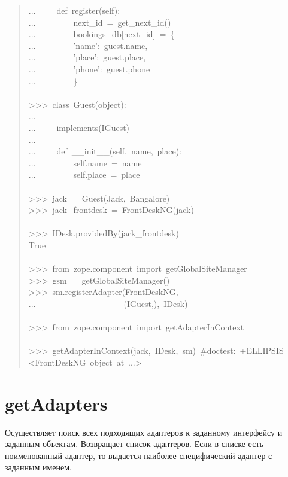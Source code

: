 \documentclass[14pt,a4paper,openany,twoside,final]{extbook}
\begin{document}
\begin{quote}
{...~~~~~def~register(self):\\
...~~~~~~~~~next\_id~=~get\_next\_id()\\
...~~~~~~~~~bookings\_db{[}next\_id{]}~=~\{\\
...~~~~~~~~~'name':~guest.name,\\
...~~~~~~~~~'place':~guest.place,\\
...~~~~~~~~~'phone':~guest.phone\\
...~~~~~~~~~\}\\
~\\
>{}>{}>~class~Guest(object):\\
...\\
...~~~~~implements(IGuest)\\
...\\
...~~~~~def~\_\_init\_\_(self,~name,~place):\\
...~~~~~~~~~self.name~=~name\\
...~~~~~~~~~self.place~=~place\\
~\\
>{}>{}>~jack~=~Guest(\textquotedbl{}Jack\textquotedbl{},~\textquotedbl{}Bangalore\textquotedbl{})\\
>{}>{}>~jack\_frontdesk~=~FrontDeskNG(jack)\\
~\\
>{}>{}>~IDesk.providedBy(jack\_frontdesk)\\
True\\
~\\
>{}>{}>~from~zope.component~import~getGlobalSiteManager\\
>{}>{}>~gsm~=~getGlobalSiteManager()\\
>{}>{}>~sm.registerAdapter(FrontDeskNG,\\
...~~~~~~~~~~~~~~~~~~~~~(IGuest,),~IDesk)\\
~\\
>{}>{}>~from~zope.component~import~getAdapterInContext\\
~\\
>{}>{}>~getAdapterInContext(jack,~IDesk,~sm)~\#doctest:~+ELLIPSIS\\
<FrontDeskNG~object~at~...>
}
\end{quote}


\section*{getAdapters%
  \label{getadapters}%
}

Осуществляет поиск всех подходящих адаптеров к заданному интерфейсу и
заданным объектам.  Возвращает список адаптеров.  Если в списке есть
поименованный адаптер, то выдается наиболее специфический адаптер с
заданным именем.
\end{document}
